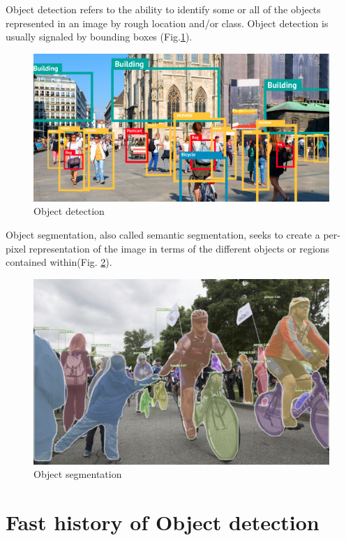 \documentclass[11pt,a4paper,twocolumn,twoside]{article}
\begin{document}
Object detection refers to the ability to identify some or all of the objects represented in an image by rough location and/or class. Object detection is usually signaled by bounding boxes (Fig.\ref{fig:Object_detection}).

\renewcommand{\headrulewidth}{1pt}

\begin{figure}[ht]
\centering
\includegraphics[width=0.9\linewidth]{Resources/Images/object_detection.jpg}
\caption{Object detection}
\label{fig:Object_detection}
\end{figure}

Object segmentation, also called semantic segmentation, seeks to create a per-pixel representation of the image in terms of the different objects or regions contained within(Fig. \ref{fig:Object_segmentation}). 

\begin{figure}[ht]
    \centering
    \includegraphics[width=0.8\linewidth]{Resources/Images/object_segmentation.jpg}
    \caption{Object segmentation}
    \label{fig:Object_segmentation}
    \end{figure}


\section{Fast history of Object detection}
\end{document}
